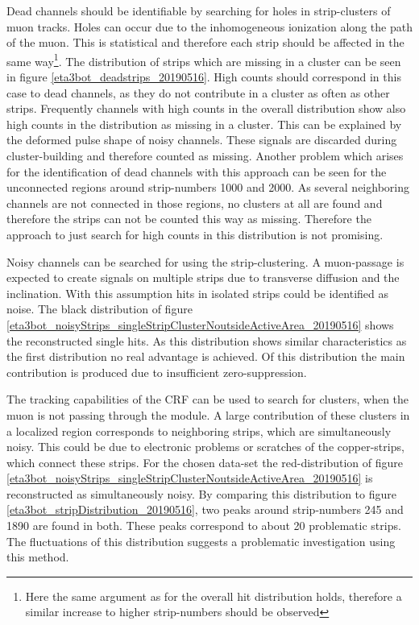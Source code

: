 \documentclass[
twoside,            %
BCOR1.4cm,          %
10pt,               %
headings=normal,    %
headsepline,        %
clearplainpage,		%
final,              %
div=14,
open=right,
bibliography=toc
]{scrreprt}
\begin{document}
Dead channels should be identifiable by searching for holes in strip-clusters of muon tracks.
Holes can occur due to the inhomogeneous ionization along the path of the muon.
This is statistical and therefore each strip should be affected in the same way\footnote{
	Here the same argument as for the overall hit distribution holds, therefore a similar increase to higher strip-numbers should be observed
}.
The distribution of strips which are missing in a cluster can be seen in figure \ref{eta3bot_deadstrips_20190516}.
High counts should correspond in this case to dead channels, as they do not contribute in a cluster as often as other strips.
Frequently channels with high counts in the overall distribution show also high counts in the distribution as missing in a cluster.
This can be explained by the deformed pulse shape of noisy channels. 
These signals are discarded during cluster-building and therefore counted as missing.
Another problem which arises for the identification of dead channels with this approach can be seen for the unconnected regions around strip-numbers 1000 and 2000.
As several neighboring channels are not connected in those regions, no clusters at all are found and therefore the strips can not be counted this way as missing.
Therefore the approach to just search for high counts in this distribution is not promising.

Noisy channels can be searched for using the strip-clustering.
A muon-passage is expected to create signals on multiple strips due to transverse diffusion and the inclination.
With this assumption hits in isolated strips could be identified as noise.
The black distribution of figure \ref{eta3bot_noisyStrips_singleStripClusterNoutsideActiveArea_20190516} shows the reconstructed single hits. 
As this distribution shows similar characteristics as the first distribution no real advantage is achieved.
Of this distribution the main contribution is produced due to insufficient zero-suppression.

The tracking capabilities of the CRF can be used to search for clusters, when the muon is not passing through the module.
A large contribution of these clusters in a localized region corresponds to neighboring strips, which are simultaneously noisy.
This could be due to electronic problems or scratches of the copper-strips, which connect these strips.
For the chosen data-set the red-distribution of figure \ref{eta3bot_noisyStrips_singleStripClusterNoutsideActiveArea_20190516} is reconstructed as simultaneously noisy.
By comparing this distribution to figure \ref{eta3bot_stripDistribution_20190516}, two peaks around strip-numbers 245 and 1890 are found in both.
These peaks correspond to about 20 problematic strips.
The fluctuations of this distribution suggests a problematic investigation using this method.
\end{document}
